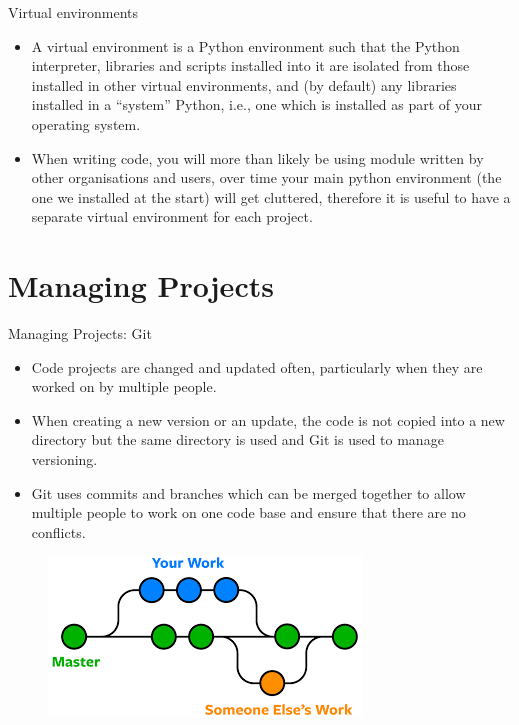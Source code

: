 \documentclass[aspectratio=169]{beamer}
\begin{document}
\begin{frame}{Virtual environments}

\begin{itemize}
	\item A virtual environment is a Python environment such that the Python interpreter, libraries and scripts installed into it are isolated from those installed in other virtual environments, and (by default) any libraries installed in a “system” Python, i.e., one which is installed as part of your operating system.
	\item When writing code, you will more than likely be using module written by other organisations and users, over time your main python environment (the one we installed at the start) will get cluttered, therefore it is useful to have a separate virtual environment for each project. 
\end{itemize}
 	
\end{frame}

\section{Managing Projects}

\begin{frame}{Managing Projects: Git}


	\begin{itemize}
		\item Code projects are changed and updated often, particularly when they are worked on by multiple people. 
		\item When creating a new version or an update, the code is not copied into a new directory but the same directory is used and Git is used to manage versioning.
		\item Git uses commits and branches which can be merged together to allow multiple people to work on one code base and ensure that there are no conflicts. 
	\end{itemize}

\begin{figure}
\centering	
	\includegraphics[scale=0.5]{graphics/git.png}
\end{figure}

\end{frame}
\end{document}
